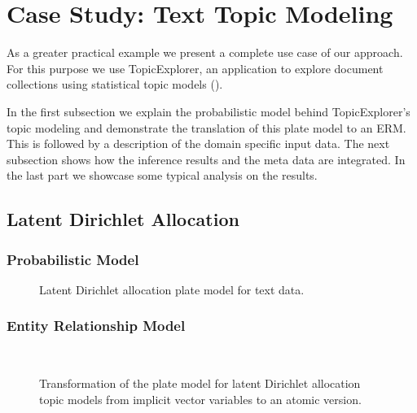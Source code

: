 \section{Case Study: Text Topic Modeling}\label{sec:casestudy}

As a greater practical example we present a complete use case of our approach. For this purpose we use TopicExplorer, an application to explore document collections using statistical topic models (\cite{hinneburg2012topicexplorer}).

In the first subsection we explain the probabilistic model behind TopicExplorer's topic modeling and demonstrate the translation of this plate model to an ERM. This is followed by a description of the domain specific input data. The next subsection shows how the inference results and the meta data are integrated. In the last part we showcase some typical analysis on the results.

\subsection{Latent Dirichlet Allocation}

\subsubsection{Probabilistic Model}

\begin{figure}[t]
\centering
\scalebox{\tikzScale}{\adjustTikzSize }
\caption{Latent Dirichlet allocation plate model for text data.}\label{fig:topic_platemodel}
\end{figure}

\subsubsection{Entity Relationship Model}

\begin{figure}[t]
\begin{minipage}[t]{0.49\linewidth}
	\begin{center}
	\end{center}
\end{minipage}
\hspace{0.0cm}
\begin{minipage}[t]{0.49\linewidth}
	\begin{center}
	\end{center}
\end{minipage}\\
\caption{Transformation of the plate model for latent Dirichlet allocation topic models from implicit vector variables to an atomic version.}
\label{img:topic_platemodels}
\end{figure}

